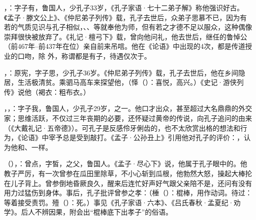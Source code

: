 ，：字子有，鲁国人，少孔子33岁，《孔子家语·七十二弟子解》称他强识好古。《孟子·滕文公上》、《仲尼弟子列传》载，孔子去世后，众弟子思慕不已，因为有若的气质见识与孔子相似，、、等就奉他为师，但有若之才德不足以服众，这种偶像崇拜很快被放弃了。《礼记·檀弓下》载，曾向他问礼，他去世后，继任的鲁悼公（前467年--前437年在位）亲自前来吊唁。他在《论语》中出现的4次，都是传道授业的口吻，除  外，称谓都是有子，待遇仅次于。

，：原宪，字子思，少孔子36岁。《仲尼弟子列传》载，孔子去世后，他在乡间隐居，生活极清贫。乘驷马高车来探望他，（怿（）：喜悦，高兴。）《史记·游侠列传》说他（褐衣：粗布衣。） %

，，：字子我，鲁国人，少孔子29岁，之一。他口才出众，甚至超过大名鼎鼎的外交家；思维活跃，不仅过三年丧期的必要，还怀疑过黄帝的传说，向孔子追问的由来（《大戴礼记·五帝德》）。可孔子是反感伶牙俐齿的，也不太欣赏出格的想法和行为，《论语》中宰予总是受到敲打。《孟子·公孙丑上》引用他对孔子的评价：，认为他和、一样。

（），：曾点，字皙，之父，鲁国人。《孟子·尽心下》说，他属于孔子眼中的。他教子严厉，有一次曾参在瓜田里除草，不小心斩到瓜根，他勃然大怒，操起大棒抡在儿子背上。曾参倒地昏厥良久，醒来后连忙好声好气跟父亲陪不是，还问有没有用力过猛伤到身体。事后，孔子批评曾参之孝：（棰（）：棍棒，用作动词。待过：等着接受责罚。殪（）：死。）事见《孔子家语·六本》、《吕氏春秋·孟夏纪·劝学》。后人不辨因果，附会出“棍棒底下出孝子”的俗语。

